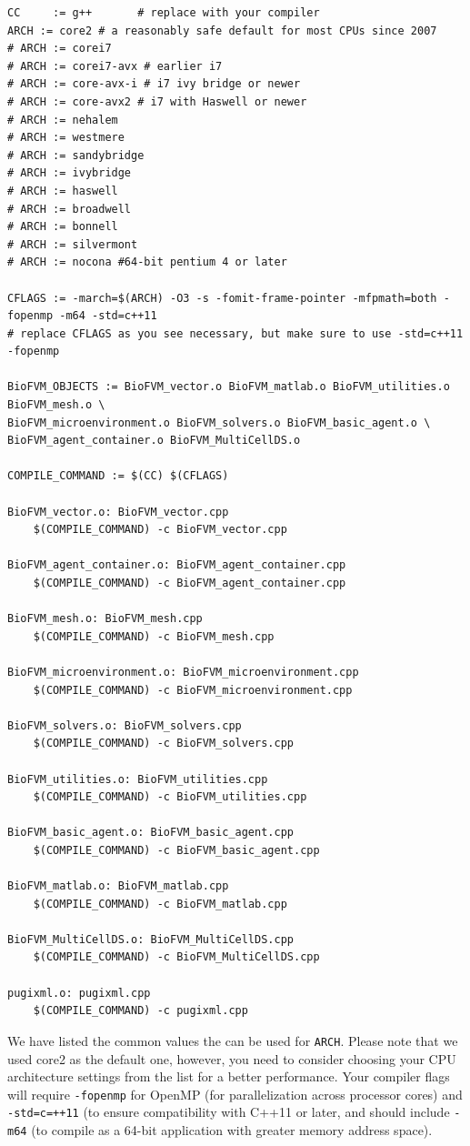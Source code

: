 \documentclass[11pt]{article}
\begin{document}
\begin{verbatim}
CC     := g++       # replace with your compiler
ARCH := core2 # a reasonably safe default for most CPUs since 2007
# ARCH := corei7
# ARCH := corei7-avx # earlier i7
# ARCH := core-avx-i # i7 ivy bridge or newer
# ARCH := core-avx2 # i7 with Haswell or newer
# ARCH := nehalem
# ARCH := westmere
# ARCH := sandybridge
# ARCH := ivybridge
# ARCH := haswell
# ARCH := broadwell
# ARCH := bonnell
# ARCH := silvermont
# ARCH := nocona #64-bit pentium 4 or later

CFLAGS := -march=$(ARCH) -O3 -s -fomit-frame-pointer -mfpmath=both -fopenmp -m64 -std=c++11
# replace CFLAGS as you see necessary, but make sure to use -std=c++11 -fopenmp

BioFVM_OBJECTS := BioFVM_vector.o BioFVM_matlab.o BioFVM_utilities.o BioFVM_mesh.o \
BioFVM_microenvironment.o BioFVM_solvers.o BioFVM_basic_agent.o \
BioFVM_agent_container.o BioFVM_MultiCellDS.o 

COMPILE_COMMAND := $(CC) $(CFLAGS)

BioFVM_vector.o: BioFVM_vector.cpp
	$(COMPILE_COMMAND) -c BioFVM_vector.cpp

BioFVM_agent_container.o: BioFVM_agent_container.cpp
	$(COMPILE_COMMAND) -c BioFVM_agent_container.cpp
	
BioFVM_mesh.o: BioFVM_mesh.cpp
	$(COMPILE_COMMAND) -c BioFVM_mesh.cpp

BioFVM_microenvironment.o: BioFVM_microenvironment.cpp
	$(COMPILE_COMMAND) -c BioFVM_microenvironment.cpp

BioFVM_solvers.o: BioFVM_solvers.cpp
	$(COMPILE_COMMAND) -c BioFVM_solvers.cpp

BioFVM_utilities.o: BioFVM_utilities.cpp
	$(COMPILE_COMMAND) -c BioFVM_utilities.cpp
	
BioFVM_basic_agent.o: BioFVM_basic_agent.cpp
	$(COMPILE_COMMAND) -c BioFVM_basic_agent.cpp
	
BioFVM_matlab.o: BioFVM_matlab.cpp
	$(COMPILE_COMMAND) -c BioFVM_matlab.cpp

BioFVM_MultiCellDS.o: BioFVM_MultiCellDS.cpp
	$(COMPILE_COMMAND) -c BioFVM_MultiCellDS.cpp

pugixml.o: pugixml.cpp
	$(COMPILE_COMMAND) -c pugixml.cpp
\end{verbatim}

We have listed the common values the can be used for \verb:ARCH:. Please note that we used core2 as the default 
one, however, you need to consider choosing your CPU architecture settings from the list for a better performance.
Your compiler flags will require \verb:-fopenmp: for OpenMP (for parallelization
across processor cores) and \verb:-std=c=++11: (to ensure compatibility with C++11 or
later, and should include \verb:-m64: (to compile
as a 64-bit application with greater memory address space).
\end{document}
